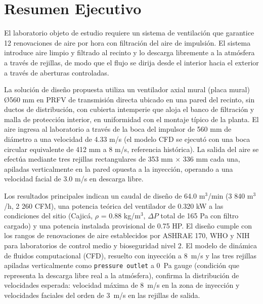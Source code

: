 \newpage
\section*{Resumen Ejecutivo}

El laboratorio objeto de estudio requiere un sistema de ventilación que garantice 12 renovaciones de aire por hora con filtración del aire de impulsión. El sistema introduce aire limpio y filtrado al recinto y lo descarga libremente a la atmósfera a través de rejillas, de modo que el flujo se dirija desde el interior hacia el exterior a través de aberturas controladas.

La solución de diseño propuesta utiliza un ventilador axial mural (placa mural) Ø560 mm en PRFV de transmisión directa ubicado en una pared del recinto, sin ductos de distribución, con cubierta intemperie que aloja el banco de filtración y malla de protección interior, en uniformidad con el montaje típico de la planta. El aire ingresa al laboratorio a través de la boca del impulsor de 560 mm de diámetro a una velocidad de 4.33 m/s (el modelo CFD se ejecutó con una boca circular equivalente de 412 mm a 8 m/s, referencia histórica). La salida del aire se efectúa mediante tres rejillas rectangulares de 353 mm $\times$ 336 mm cada una, apiladas verticalmente en la pared opuesta a la inyección, operando a una velocidad facial de 3.0 m/s en descarga libre.

Los resultados principales indican un caudal de diseño de 64.0 m$^3$/min (3 840 m$^3$/h, 2 260 CFM), una potencia teórica del ventilador de 0.320 kW a las condiciones del sitio (Cajicá, $\rho$ = 0.88 kg/m$^3$, $\Delta P$ total de 165 Pa con filtro cargado) y una potencia instalada provisional de 0.75 HP. El diseño cumple con los rangos de renovaciones de aire establecidos por ASHRAE 170, WHO y NIH para laboratorios de control medio y bioseguridad nivel 2. El modelo de dinámica de fluidos computacional (CFD), resuelto con inyección a \SI{8}{m/s} y las tres rejillas apiladas verticalmente como \texttt{pressure outlet} a \SI{0}{Pa} gauge (condición que representa la descarga libre real a la atmósfera), confirma la distribución de velocidades esperada: velocidad máxima de \SI{8}{m/s} en la zona de inyección y velocidades faciales del orden de \SI{3}{m/s} en las rejillas de salida.

\newpage
